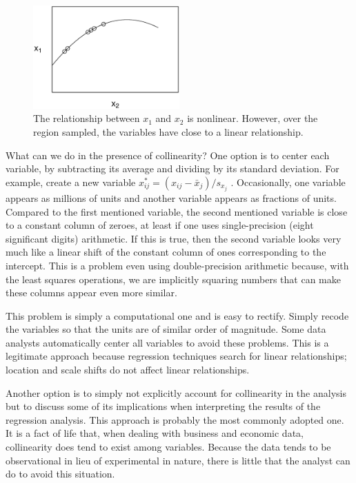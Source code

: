 \begin{figure}[htp]
  \begin{center}
    \includegraphics[width=0.5\textwidth]{Chapter5/F5Nearlinear.eps}
    \caption{\label{F5:Nearlinear} \small  The relationship
between $x_1$ and $x_2$ is nonlinear. However, over the region
sampled, the variables have close to a linear relationship.}
  \end{center}
\end{figure}



What can we do in the presence of collinearity? One option is to center each
variable, by subtracting its average and dividing by its standard deviation.
For example, create a new variable $x_{ij}^{\ast }=(x_{ij}-\bar{x}%
_j)/s_{x_j}$ . Occasionally, one variable appears as millions of
units and another variable appears as fractions of units. Compared
to the first mentioned variable, the second mentioned variable is
close to a constant column of zeroes, at least if one uses
single-precision (eight significant digits) arithmetic. If this is
true, then the second variable looks very much like a linear shift
of the constant column of ones corresponding to the intercept. This
is a problem even using double-precision arithmetic because, with
the least squares operations, we are implicitly squaring numbers
that can make these columns appear even more similar.

This problem is simply a computational one and is easy to rectify.
Simply recode the variables so that the units are of similar order
of magnitude. Some data analysts automatically center all variables
to avoid these problems. This is a legitimate approach because
regression techniques search for linear relationships; location
 and scale shifts do not affect linear relationships.

Another option is to simply not explicitly account for collinearity in the
analysis but to discuss some of its implications when interpreting the
results of the regression analysis. This approach is probably the most
commonly adopted one. It is a fact of life that, when dealing with business
and economic data, collinearity does tend to exist among variables. Because
the data tends to be observational in lieu of experimental in nature, there
is little that the analyst can do to avoid this situation.

